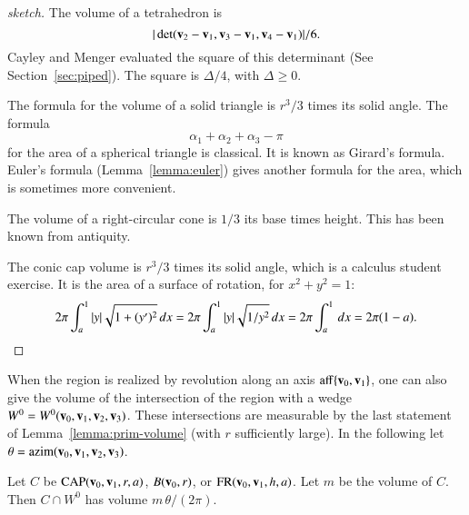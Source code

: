 \begin{proof}[sketch]
The volume of a tetrahedron is
\begin{displaymath}
|\det({\mathbf v}_2-{\mathbf v}_1,{\mathbf v}_3-{\mathbf v}_1,{\mathbf v}_4-{\mathbf v}_1)|/6.
\end{displaymath}
Cayley and Menger evaluated the square of this determinant (See
Section~\ref{sec:piped}).  The square is $\Delta/4$, with
$\Delta\ge0$.  
%

The formula for the volume of a solid triangle is $r^3/3$ times
its solid angle.  The formula 
\begin{displaymath}\alpha_1+\alpha_2+\alpha_3-\pi\label{eqn:girard}\end{displaymath}
for the area of a spherical triangle is classical.  It is known as
Girard's formula. Euler's formula (Lemma~\ref{lemma:euler}) gives
another formula for the area, which is sometimes more convenient.
%
%

The volume of a right-circular cone is $1/3$ its base times height.  This
has been known from antiquity.  

The conic cap volume is $r^3/3$ times its solid angle, which is a
calculus student exercise.  It is the area of a surface of rotation,
for $x^2 + y^2 = 1$:
$$
2\pi \int_a^1  |y| \sqrt{1 + (y')^2}\,dx 
= 2\pi\int_a^1  |y| \sqrt{1/y^2}\,dx 
= 2\pi \int_a^1\,dx = 2\pi (1-a).
$$
\end{proof}




%

When the region is realized by revolution along an axis
${\operatorname{aff}}\{{\mathbf v}_0,{\mathbf v}_1\}$, one can also give the volume of the
intersection of the region with a wedge
$W^0=W^0({\mathbf v}_0,{\mathbf v}_1,{\mathbf v}_2,{\mathbf v}_3)$.  These intersections are measurable by
the last statement of Lemma~\ref{lemma:prim-volume} (with $r$
sufficiently large).  In the following let $\theta =
{\operatorname{azim}}({\mathbf v}_0,{\mathbf v}_1,{\mathbf v}_2,{\mathbf v}_3)$.  %
%

\begin{lemma}\label{lemma:wedge-vol}  
Let $C$ be ${\operatorname{CAP}}({\mathbf v}_0,{\mathbf v}_1,r,a)$, $B({\mathbf v}_0,r)$,  
or ${\operatorname{FR}}({\mathbf v}_0,{\mathbf v}_1,h,a)$.  Let $m$ be the volume of $C$.  Then
$C\cap W^0$ has volume $m\,\theta/(2\pi)$.
\end{lemma}
%

